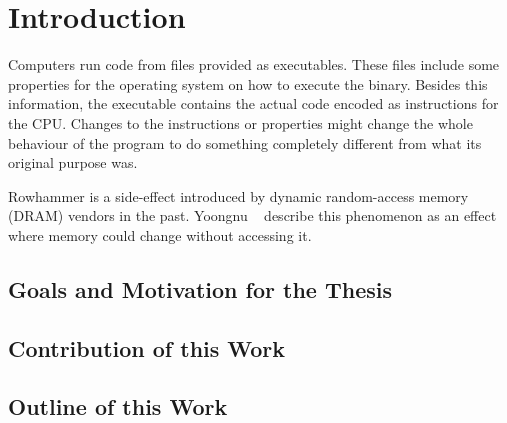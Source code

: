 \chapter{Introduction}\label{sec:intro}

Computers run code from files provided as executables. These files include some
properties for the operating system on how to execute the binary. Besides this
information, the executable contains the actual code encoded as instructions for
the CPU.
Changes to the instructions or properties might change the whole behaviour of
the program to do something completely different from what its original purpose
was.

Rowhammer is a side-effect introduced by dynamic random-access memory (DRAM)
vendors in the past. Yoongnu \etal~\cite{rowhammergeneral} describe this
phenomenon as an effect where memory could change without accessing it.

\section{Goals and Motivation for the Thesis}

\section{Contribution of this Work}

\section{Outline of this Work}

